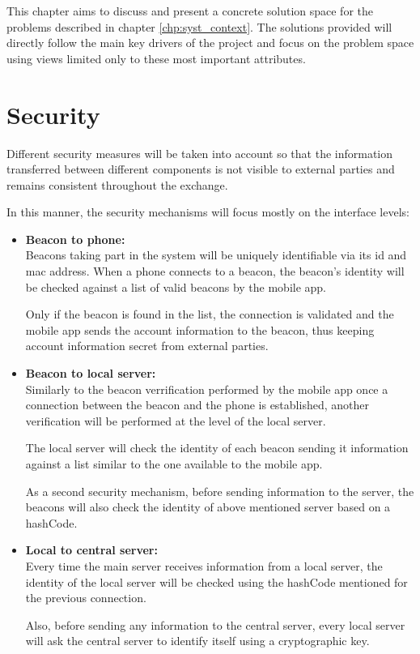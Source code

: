 
This chapter aims to discuss and present a concrete solution space for the problems described in chapter  \ref{chp:syst_context}. The solutions provided will directly follow the main key drivers of the project and focus on the problem space using views limited only to these most important attributes.

\section{Security}
Different security measures will be taken into account so that the information transferred between different components is not visible to external parties and remains consistent throughout the exchange.

In this manner, the security mechanisms will focus mostly on the interface levels:

\begin{itemize}
	\item \textbf{Beacon to phone:} \\
	Beacons taking part in the system will be uniquely identifiable via its id and mac address. When a phone connects to a beacon, the beacon's identity will be checked against a list of valid beacons by the mobile app. 
	
	Only if the beacon is found in the list, the connection is validated and the mobile app sends the account information to the beacon, thus keeping account information secret from external parties. 
	\item \textbf{Beacon to local server:} \\
	Similarly to the beacon verrification performed by the mobile app once a connection between the beacon and the phone is established, another verification will be performed at the level of the local server.
	
	The local server will check the identity of each beacon sending it information against a list similar to the one available to the mobile app. 
	
	As a second security mechanism, before sending information to the server, the beacons will also check the identity of above mentioned server based on a hashCode. 
	
	\item \textbf{Local to central server:} \\
	Every time the main server receives information from a local server, the identity of the local server will be checked using the hashCode mentioned for the previous connection. 
	
	Also, before sending any information to the central server, every local server will ask the central server to identify itself using a cryptographic key.
\end{itemize}


